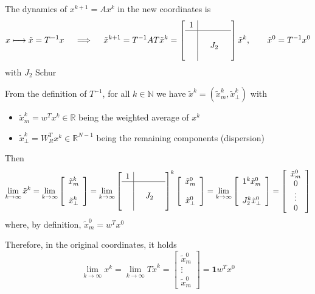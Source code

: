 \documentclass{book}
\newcommand{\R}{\mathbb{R}}
\newcommand{\N}{\mathbb{N}}
\theoremstyle{theoremv2}
\theoremstyle{defv2}
\theoremstyle{remark}
\theoremstyle{remark}
\theoremstyle{definition}
\theoremstyle{definition}
\begin{document}
The dynamics of $x^{k+1}=Ax^k$ in the new coordinates is 
\[
    x \longmapsto \tilde{x} = T^{-1}x \quad \implies \quad \tilde{x}^{k+1} = T^{-1}AT\tilde{x}^k = \left[\begin{array}{c| c c c }
        1 & & & \\ \hline \\ & & J_2 & \\ & & & 
    \end{array}\right] \tilde{x}^k, \qquad \tilde{x}^0 = T^{-1}x^0
\]
with $J_2$ Schur

From the definition of $T^{-1}$, for all $k\in\N$ we have $\tilde{x}^k=(\tilde{x}_m^k,\tilde{x}_\perp^k)$ with 
\begin{itemize}
    \item $\tilde{x}_m^k = w^T x^k\in\R$ being the weighted average of $x^k$ 
    \item $\tilde{x}_\perp^k=W_R^Tx^k\in\R^{N-1}$ being the remaining components (dispersion) 
\end{itemize}
Then 
\[
    \lim_{k\to\infty} \tilde{x}^k = \lim_{k\to\infty} \left[\begin{array}{c}
        \tilde{x}_m^k \\ \\ \tilde{x}_\perp^k
    \end{array}\right] = \lim_{k\to\infty}\left[\begin{array}{c| c c c }
        1 & & & \\ \hline \\ & & J_2 & \\ & & & 
    \end{array}\right]^k \left[\begin{array}{c}
        \tilde{x}_m^0 \\ \\ \tilde{x}_\perp^0
    \end{array}\right] = \lim_{k\to\infty} \left[\begin{array}{c}
        1^k \tilde{x}_m^0 \\ \\ J_2^k\tilde{x}_\perp^0
    \end{array}\right] = \left[\begin{array}{c}
        \tilde{x}_m^0 \\ 0 \\ \vdots \\ 0
    \end{array}\right]
\]
where, by definition, $\tilde{x}_m^0=w^Tx^0$

Therefore, in the original coordinates, it holds 
\[
    \lim_{k\to\infty} x^k = \lim_{k\to\infty} T\tilde{x}^k = \left[\begin{array}{c}
        \tilde{x}_m^0 \\ \vdots \\ \tilde{x}_m^0
    \end{array}\right] = \boldsymbol{1}w^Tx^0
\]
\end{document}
